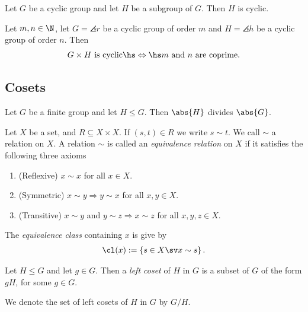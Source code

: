\documentclass{article}
\begin{document}
\begin{theorem}
	Let $G$ be a cyclic group and let $H$ be a subgroup of $G$. Then
	$H$ is cyclic.
\end{theorem}

\begin{theorem}
	Let $m,n\in\N$, let $G=\angles r$ be a cyclic group of order $m$
	and $H=\angles h$ be a cyclic group of order $n$. Then
	\begin{align*}
		\text{$G\times H$ is cyclic} \hs\Leftrightarrow\hs \text{$m$ and $n$ are coprime.}
	\end{align*}
\end{theorem}

\subsection{Cosets}

\begin{theorem}
	Let $G$ be a finite group and let $H\leq G$.
	Then $\abs{H}$ divides $\abs{G}$.
\end{theorem}

\begin{definition}
	Let $X$ be a set, and $R\subseteq X\times X$.
	If $(s,t)\in R$ we write $s\sim t$. We call $\sim$
	a relation on $X$. A relation $\sim$ is called an
	\emph{equivalence relation} on $X$ if it satisfies
	the following three axioms
	\begin{enumerate}[label=E\arabic*.]
		\item (Reflexive) $x\sim x$ for all $x\in X$.
		\item (Symmetric) $x\sim y \Rightarrow y\sim x$ for all $x,y\in X$.
		\item (Transitive) $x\sim y$ and $y\sim z \Rightarrow x\sim z$ for all $x,y,z\in X$.
	\end{enumerate}
	The \emph{equivalence class} containing $x$ is give by
	\begin{align*}
		\cl(x) := \left\{s\in X \sv x\sim s\right\}.
	\end{align*}
\end{definition}

\setcounter{theorem}{3}
\begin{definition}
	Let $H\leq G$ and let $g\in G$. Then a \emph{left coset} of $H$
	in $G$ is a subset of $G$ of the form $gH$, for some $g\in G$.
\end{definition}

\setcounter{theorem}{5}
\begin{definition}
	We denote the set of left cosets of $H$ in $G$ by $G/H$.
\end{definition}
\end{document}
